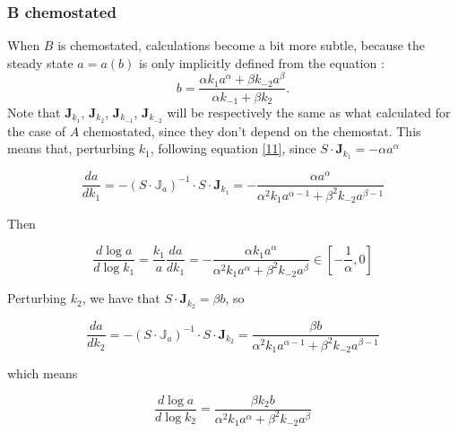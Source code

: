 \documentclass{article}
\begin{document}
	\subsubsection{B chemostated}
	When $B$ is chemostated, calculations become a bit more subtle, because the steady state $a=a(b)$ is only implicitly defined from the equation :
	$$b=\frac{\alpha k_1 a^{\alpha}+\beta k_{-2} a^{\beta}}{\alpha k_{-1}+\beta k_2}.$$
	Note that
	$\mathbf{J}_{k_1}$, $\mathbf{J}_{k_2}$, $\mathbf{J}_{k_{-1}}$, $\mathbf{J}_{k_{-2}}$ will be respectively the same as what calculated for the case of $A$ chemostated, since they don't depend on the chemostat. This means that, perturbing $k_1$, following equation \eqref{11}, since $S\cdot \mathbf{J}_{k_1}=-\alpha a^{\alpha}$
	
	\begin{center}
		\begin{equation}
			\frac{d a}{d k_1} = - \left( S \cdot {\mathbb{J}}_{a} \right)^ {-1} \cdot S \cdot \mathbf{J}_{k_1} = -\frac{\alpha a^{\alpha}}{\alpha^2 k_1 a^{\alpha-1}+\beta^2 k_{-2}a^{\beta-1}}
		\end{equation}
	\end{center}
	
	Then 
	\begin{center}
		\begin{equation}
			\frac{d \log a}{d \log k_1} = \frac{k_1}{a} \frac{d a}{d k_1} = -\frac{\alpha k_1 a^{\alpha}}{\alpha^2 k_1 a^{\alpha}+\beta^2 k_{-2}a^{\beta}} \in \left[-\frac{1}{\alpha},0\right]
		\end{equation}
	\end{center}
	
	Perturbing $k_2$, we have that $S\cdot \mathbf{J}_{k_2}=\beta b$, so
	
	\begin{center}
		\begin{equation}
			\frac{d a}{d k_2} = - \left( S \cdot {\mathbb{J}}_{a} \right)^ {-1} \cdot S \cdot \mathbf{J}_{k_2} = \frac{\beta b}{\alpha^2 k_1 a^{\alpha-1}+\beta^2 k_{-2}a^{\beta-1}}
		\end{equation}
	\end{center}
	
	which means
	
	\begin{center}
		\begin{equation}
			\frac{d \log a}{d \log k_2} = \frac{\beta k_2 b}{\alpha^2 k_1 a^{\alpha}+\beta^2 k_{-2}a^{\beta}}
		\end{equation}
	\end{center}
	
\end{document}
